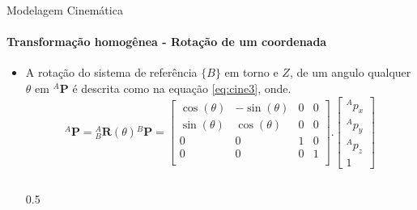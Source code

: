 \documentclass[aspectratio=169]{beamer}
\begin{document}
\begin{frame}[t]{Modelagem Cinemática}
    \framesubtitle{Transformação homogênea - Rotação de um coordenada}
    \begin{itemize}
        \item A rotação do sistema de referência $\{B\}$ em torno e $Z$, de um angulo qualquer $\theta$ em ${}^A\mathbf{P}$ é descrita como na equação \eqref{eq:cine3}, onde.
              \begin{equation}\label{eq:cine3}
                  {}^A\mathbf{P} = {}_B^A \mathbf{R}(\theta) {}^B\mathbf{P} =
                  \begin{bmatrix}
                      \cos(\theta) & -\sin(\theta) & 0 & 0 \\
                      \sin(\theta) & \cos(\theta) & 0 & 0 \\
                      0            & 0            & 1 & 0 \\
                      0            & 0            & 0 & 1 \\
                  \end{bmatrix}.
                  \begin{bmatrix}
                      {}^Ap_x \\
                      {}^Ap_y \\
                      {}^Ap_z \\
                      1
                  \end{bmatrix}
              \end{equation}
              \begin{columns}
                \begin{column}[c]{0.5\textwidth}
                \begin{figure}[!ht]
                    \centering
\end{figure}
\end{column}
\end{columns}
\end{itemize}
\end{frame}
\end{document}
